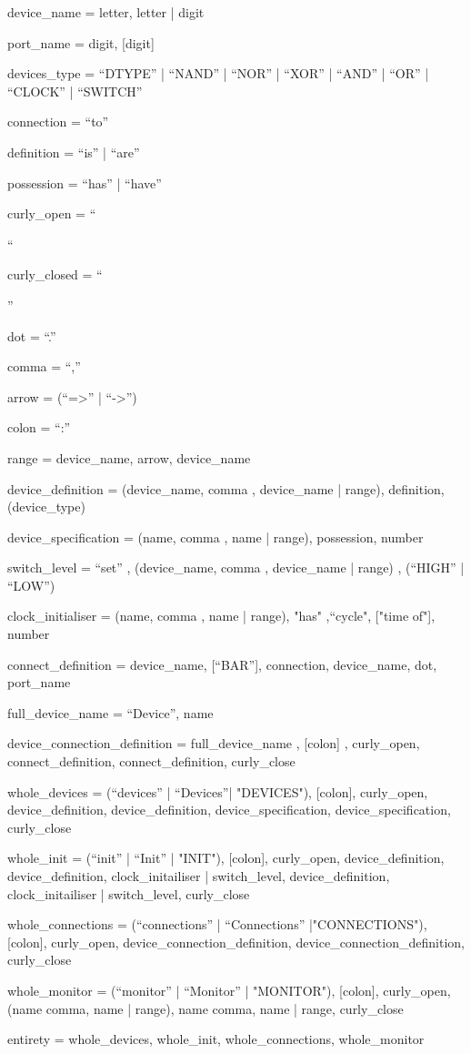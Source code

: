 \documentclass[12pt]{article}
\begin{document}
\begin{spverbatim}
device_name =  letter, {letter | digit}

port_name =  digit, [digit] 

devices_type = “DTYPE” | “NAND” | “NOR” | “XOR” | “AND” | “OR” | “CLOCK” | “SWITCH”

connection = “to”

definition = “is” | “are”

possession = “has” | “have”

curly_open = “{“

curly_closed = “}”

dot =  “.”

comma = “,”

arrow = (“=>” | “->”)

colon = “:”

range = device_name, arrow, device_name

device_definition = (device_name, {comma , device_name} | range), definition, (device_type)

device_specification = (name, {comma , name} | range), possession, number

switch_level = “set” , (device_name, {comma , device_name} | range) , (“HIGH” | “LOW”)

clock_initialiser = (name, {comma , name} | range), "has" ,“cycle", ["time of"], number

connect_definition = device_name, [“BAR”], connection, device_name, dot, port_name

full_device_name = “Device”, name

device_connection_definition = full_device_name , [colon] , curly_open, connect_definition, {connect_definition}, curly_close

whole_devices = (“devices” | “Devices”| "DEVICES"), [colon], curly_open, device_definition, {device_definition}, device_specification, {device_specification}, curly_close

whole_init = (“init” | “Init” | "INIT"), [colon], curly_open, device_definition, {device_definition}, {clock_initailiser | switch_level}, {device_definition}, {clock_initailiser | switch_level}, curly_close

whole_connections = (“connections” | “Connections” |"CONNECTIONS"), [colon], curly_open, device_connection_definition, {device_connection_definition}, curly_close

whole_monitor = (“monitor” | “Monitor” | "MONITOR"), [colon], curly_open, (name {comma, name} | range), {name {comma, name} | range}, curly_close

entirety = whole_devices, whole_init, whole_connections, whole_monitor

\end{spverbatim}
\end{document}
